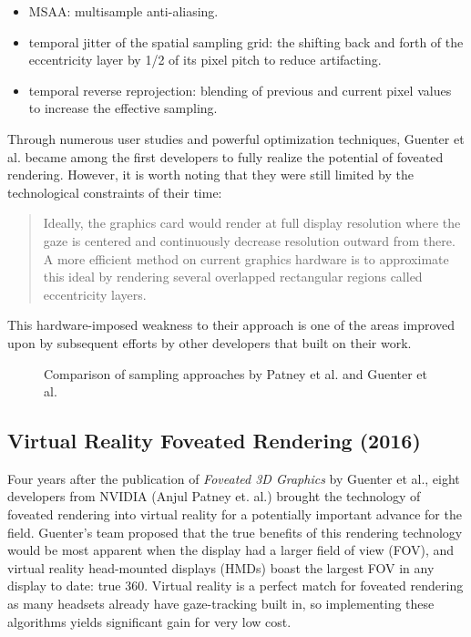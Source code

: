 \documentclass{sig-alternate}
\begin{document}
\begin{itemize}
\item MSAA: multisample anti-aliasing.
\item temporal jitter of the spatial sampling grid: the shifting back and forth of the eccentricity layer by 1/2 of its pixel pitch to reduce artifacting.
\item temporal reverse reprojection: blending of previous and current pixel values to increase the effective sampling.
\end{itemize}

Through numerous user studies and powerful optimization techniques, Guenter et al. became among the first developers to fully realize the potential of foveated rendering. However, it is worth noting that they were still limited by the technological constraints of their time:
\begin{quote}
Ideally, the graphics card would render at full display resolution
where the gaze is centered and continuously decrease resolution
outward from there. A more efficient method on current graphics
hardware is to approximate this ideal by rendering several overlapped 
rectangular regions called eccentricity layers.~\cite{Guenter:Foveated}
\end{quote}
This hardware-imposed weakness to their approach is one of the areas improved upon by subsequent efforts by other developers that built on their work. 

\begin{figure}
\centering
{}
\caption{Comparison of sampling approaches by Patney et al. and Guenter et al.~\cite{Patney:Towards}}
\label{fig:fig4}
\end{figure}

\subsection{Virtual Reality Foveated Rendering (2016)}
\label{sec:nvidia}
Four years after the publication of \textit{Foveated 3D Graphics} by Guenter et al., eight developers from NVIDIA (Anjul Patney et. al.)  brought the technology of foveated rendering into virtual reality for a potentially important advance for the field. Guenter's team proposed that the true benefits of this rendering technology would be most apparent when the display had a larger field of view (FOV), and virtual reality head-mounted displays (HMDs) boast the largest FOV in any display to date: true 360\degree. Virtual reality is a perfect match for foveated rendering as many headsets already have gaze-tracking built in, so implementing these algorithms yields significant gain for very low cost.
\end{document}
